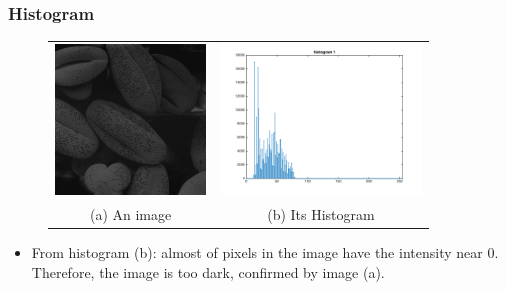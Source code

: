 \documentclass[english,11pt,table,handout]{beamer}
\begin{document}
\begin{frame}[fragile]
\frametitle{Histogram}
\begin{figure}[!h]
	\begin{table}
		\begin{tabular}{cc}
			\includegraphics[height=4cm]{./images/bean1.jpg} &
			\includegraphics[height=4cm]{./images/histogram1.png} \\
			(a) An image & (b) Its Histogram
		\end{tabular}
	\end{table}
\end{figure}
\begin{itemize}
	\item From histogram (b): almost of pixels in the image have the intensity near $0$. Therefore, the image is too dark, confirmed by image (a).
\end{itemize}
\end{frame}
\end{document}
